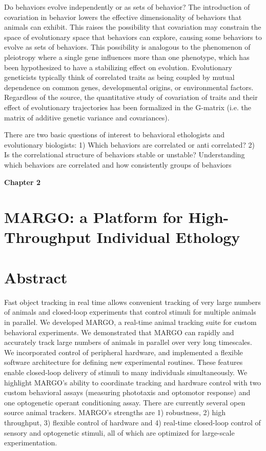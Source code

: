 \documentclass[12pt,letterpaper]{article}
\begin{document}
Do behaviors evolve independently or as sets of behavior? 
The introduction of covariation in behavior lowers the effective dimensionality of behaviors that animals can exhibit. This raises the possibility that covariation may constrain the space of evolutionary space that behaviors can explore, causing some behaviors to evolve as sets of behaviors. This possibility is analogous to the phenomenon of pleiotropy where a single gene influences more than one phenotype, which has been hypothesized to have a stabilizing effect on evolution. Evolutionary geneticists typically think of correlated traits as being coupled by mutual dependence on common genes, developmental origins, or environmental factors. Regardless of the source, the quantitative study of covariation of traits and their effect of evolutionary trajectories has been formalized in the G-matrix (i.e. the matrix of additive genetic variance and covariances). 

There are two basic questions of interest to behavioral ethologists and evolutionary biologists: 1) Which behaviors are correlated or anti correlated? 2) Is the correlational structure of behaviors stable or unstable? Understanding which behaviors are correlated and how consistently groups of behaviors


\clearpage
\begin{center}
    \Large\textbf{Chapter 2}
    \thispagestyle{empty}       %
    \clearpage
\end{center}

\section*{MARGO: a Platform for High-Throughput Individual Ethology}

\section*{Abstract}

Fast object tracking in real time allows convenient tracking of very large numbers of animals and closed-loop experiments that control stimuli for multiple animals in parallel. We developed MARGO, a real-time animal tracking suite for custom behavioral experiments. We demonstrated that MARGO can rapidly and accurately track large numbers of animals in parallel over very long timescales. We incorporated control of peripheral hardware, and implemented a flexible software architecture for defining new experimental routines. These features enable closed-loop delivery of stimuli to many individuals simultaneously. We highlight MARGO's ability to coordinate tracking and hardware control with two custom behavioral assays (measuring phototaxis and optomotor response) and one optogenetic operant conditioning assay. There are currently several open source animal trackers. MARGO’s strengths are 1) robustness, 2) high throughput, 3) flexible control of hardware and 4) real-time closed-loop control of sensory and optogenetic stimuli, all of which are optimized for large-scale experimentation.
\end{document}
